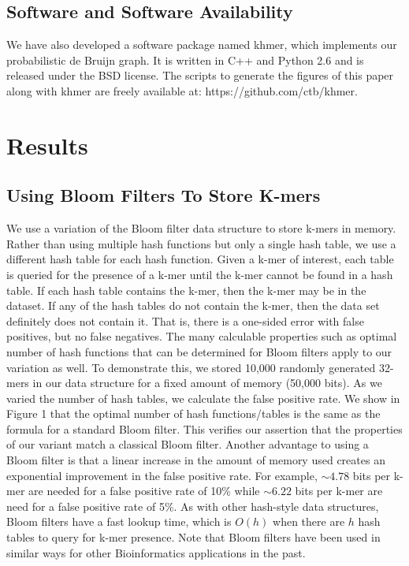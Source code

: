 \documentclass[12pt]{article} \usepackage{simplemargins}
\begin{document}
\subsection{Software and Software Availability}

We have also developed a software package named khmer, which
implements our probabilistic de Bruijn graph.  It is written in C++
and Python 2.6 and is released under the BSD license. The scripts to 
generate the figures of this paper along with khmer are freely available
at: https://github.com/ctb/khmer.

\section{Results}

\subsection{Using Bloom Filters To Store K-mers}
We use a variation of the Bloom filter data structure to store k-mers
in memory. Rather than using multiple hash functions but only a single
hash table, we use a different hash table for each hash
function. Given a k-mer of interest, each table is queried for the
presence of a k-mer until the k-mer cannot be found in a hash
table. If each hash table contains the k-mer, then the k-mer may
be in the dataset. If any of the hash tables do not contain the
k-mer, then the data set definitely does not contain it. That is, there is a one-sided
error with false positives, but no false negatives. The many
calculable properties such as optimal number of hash functions that
can be determined for Bloom filters apply to our variation as well. To
demonstrate this, we stored 10,000 randomly generated 32-mers in our
data structure for a fixed amount of memory (50,000 bits). As we
varied the number of hash tables, we calculate the false positive
rate. We show in Figure 1 that the optimal number of hash
functions/tables is the same as the formula for a standard Bloom
filter. This verifies our assertion that the properties of our 
variant match a classical Bloom filter. Another advantage to
using a Bloom filter is that a linear increase in the amount of memory
used creates an exponential improvement in the false positive
rate. For example, $\sim4.78$ bits per k-mer are needed for a false
positive rate of 10\% while $\sim6.22$ bits per k-mer are need for a false
positive rate of
5\%. As with other hash-style data structures, Bloom filters have a
fast lookup time, which is $O(h)$ when there are $h$ hash tables to query
for k-mer presence. Note that Bloom filters have been used in similar 
ways for other Bioinformatics applications in the 
past\cite{pmid20472541, haskell, pmid20426693}. 
\end{document}
